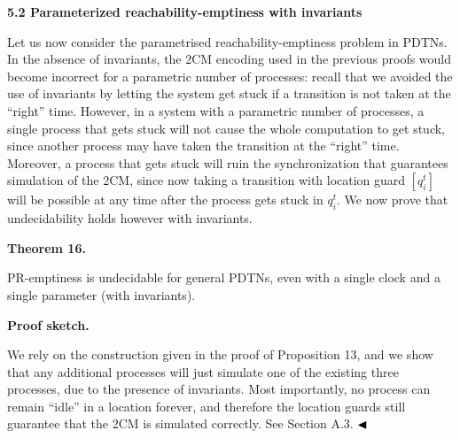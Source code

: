 
 
 
\par\medskip\noindent\textbf{5.2 Parameterized reachability-emptiness with invariants}\par
 
 
Let us now consider the parametrised reachability-emptiness problem in PDTNs. In the absence of invariants, the 2CM encoding used in the previous proofs would become incorrect for a parametric number of processes: recall that we avoided the use of invariants by letting the system get stuck if a transition is not taken at the “right” time. However, in a system with a parametric number of processes, a single process that gets stuck will not cause the whole computation to get stuck, since another process may have taken the transition at the “right” time. Moreover, a process that gets stuck will ruin the synchronization that guarantees simulation of the 2CM, since now taking a transition with location guard $[q_{i}^{t}]$ will be possible at any time after the process gets stuck in $q_{i}^{t}$. We now prove that undecidability holds however with invariants.\par
 
 
 
\par\medskip\noindent\textbf{Theorem 16.}\par
 
 
PR-emptiness is undecidable for general PDTNs, even with a single clock and a single parameter (with invariants).\par
 
 
 
 
\par\medskip\noindent\textbf{Proof sketch.}\par
 
 
We rely on the construction given in the proof of Proposition 13, and we show that any additional processes will just simulate one of the existing three processes, due to the presence of invariants. Most importantly, no process can remain “idle” in a location forever, and therefore the location guards still guarantee that the 2CM is simulated correctly. See Section A.3. $\hfill\blacktriangleleft$\par
 
